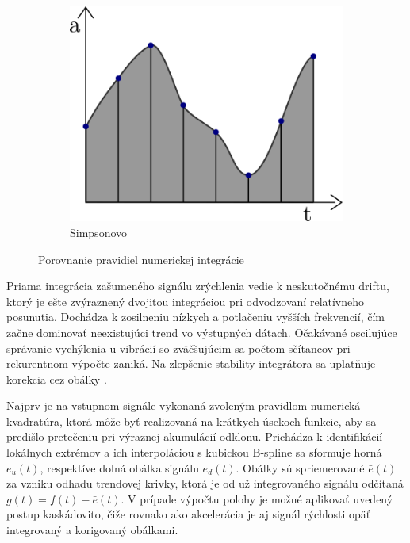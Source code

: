\begin{figure}[h]
\hfill
\begin{subfigure}[b]{0.32\textwidth}
    \centering
    \includegraphics[width=\textwidth]{figures/analysis/simpson-rule.png}
    \caption{Simpsonovo}
    \label{fig:simpson-rule}
\end{subfigure}
\caption{Porovnanie pravidiel numerickej integrácie}
\end{figure}

Priama integrácia zašumeného signálu zrýchlenia vedie k neskutočnému driftu, ktorý je ešte zvýraznený dvojitou integráciou pri
odvodzovaní relatívneho posunutia. Dochádza k zosilneniu nízkych a potlačeniu vyšších frekvencií, čím začne dominovať neexistujúci
trend vo výstupných dátach. Očakávané oscilujúce správanie vychýlenia u vibrácií so zväčšujúcim sa počtom sčítancov pri rekurentnom
výpočte zaniká. Na zlepšenie stability integrátora sa uplatňuje korekcia cez obálky \cite{integration-acceleration-envelopes}.

Najprv je na vstupnom signále vykonaná zvoleným pravidlom numerická kvadratúra, ktorá môže byť realizovaná na krátkych
úsekoch funkcie, aby sa predišlo pretečeniu pri výraznej akumulácií odklonu. Prichádza k identifikácií lokálnych extrémov a ich 
interpoláciou s kubickou B-spline sa sformuje horná $e_u(t)$, respektíve dolná
obálka signálu $e_d(t)$. Obálky sú spriemerované $\bar{e}(t)$ za vzniku odhadu trendovej krivky, ktorá je od už integrovaného
signálu odčítaná $g(t) = f(t) - \bar{e}(t)$. V prípade výpočtu polohy je možné aplikovať uvedený postup kaskádovito, čiže rovnako
ako akcelerácia je aj signál rýchlosti opäť integrovaný a korigovaný obálkami.

